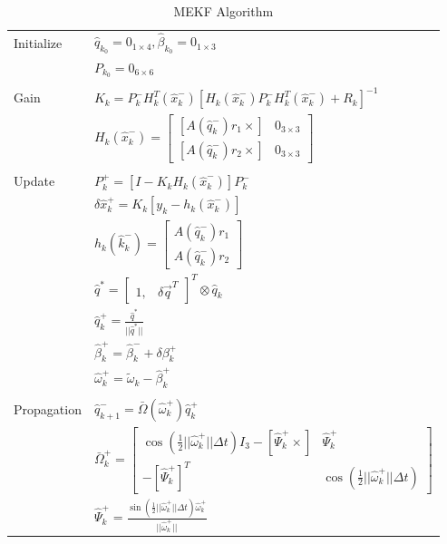 \documentclass{article}
\begin{document}
\begin{table}
\caption{MEKF Algorithm}
\label{tab:mekf}
\centering
\begin{tabular}{ll}
	\hline
	Initialize & $\hat{q}_{k_0} = 0_{1 \times 4}, \hat{\beta}_{k_0} = 0_{1 \times 3}$ \\
	 & $P_{k_0} = 0_{6 \times 6}$ \\
	\\
	Gain & $K_k = P_k^- H_k^T(\hat{x}_k^-)[H_k(\hat{x}_k^-) P_k^- H_k^T(\hat{x}_k^-) + R_k]^{-1}$ \\
	 & $H_k(\hat{x}_k^-) = \left[\begin{matrix}[A(\hat{q}_k^-)r_1 \times] & 0_{3 \times 3} \\ [A(\hat{q}_k^-)r_2 \times] & 0_{3 \times 3}\end{matrix}\right]$ \\ 
	\\
	Update & $P_k^+ = [I - K_k H_k(\hat{x}_k^-)]P_k^-$ \\ 
	 & $\delta\hat{x}_k^+ = K_k[y_k - h_k(\hat{x}_k^-)]$ \\
	 & $h_k(\hat{k}_k^-) = \left[\begin{matrix}A(\hat{q}_k^-)r_1 \\ A(\hat{q}_k^-)r_2\end{matrix}\right]$ \\
	 & $\hat{q}^* = [\begin{matrix}1, & \delta\vec{q}^T\end{matrix}]^T \otimes \hat{q}_k$ \\
	 & $\hat{q}_k^+ = \frac{\hat{q}^*}{||\hat{q}^*||}$ \\
	 & $\hat{\beta}_k^+ = \hat{\beta}_k^- + \delta\beta_k^+$ \\
	 & $\hat{\omega}_k^+ = \tilde{\omega}_k - \hat{\beta}_k^+$ \\
	\\
	Propagation & $\hat{q}_{k+1}^- = \bar{\Omega}(\hat{\omega}_k^+) \hat{q}_k^+$ \\
	 & $\bar{\Omega}_k^+ = \left[\begin{matrix}\cos(\frac{1}{2}||\hat{\omega}_k^+|| \Delta t) I_3 - [\hat{\Psi}_k^+ \times] & \hat{\Psi}_k^+ \\ -[\hat{\Psi}_k^+]^T & \cos(\frac{1}{2}||\hat{\omega}_k^+||\Delta t) \end{matrix}\right] $ \\
	 & $\hat{\Psi}_k^+ = \frac{\sin(\frac{1}{2}||\hat{\omega}_k^+||\Delta t)\hat{\omega}_k^+}{||\hat{\omega}_k^+||}$ \\

\end{tabular}
\end{table}
\end{document}
